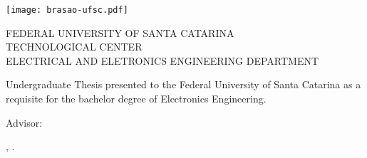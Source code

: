 \begin{titlepage}
  \begin{center}
    \texttt{[image: brasao-ufsc.pdf]}
  \end{center}

  \begin{center}
    {\small FEDERAL UNIVERSITY OF SANTA CATARINA}\\
    {\small TECHNOLOGICAL CENTER}\\
    {\small ELECTRICAL AND ELETRONICS ENGINEERING DEPARTMENT}
  \end{center}

  \vfill

  \begin{center}
    {\LARGE \thetitle}
  \end{center}

  \vfill

  \begin{center}
  Undergraduate Thesis presented to the Federal University of Santa
  Catarina as a requisite for the bachelor degree of Electronics 
  Engineering.
  \end{center}

  \vfill

  \begin{center}
    {\large \theauthor}

    \medskip
    Advisor: \theadvisor\\
  \end{center}

  \vfill

  \begin{center}
    \theplace, \thedate.
  \end{center}
\end{titlepage}

\cleardoublepageempty
